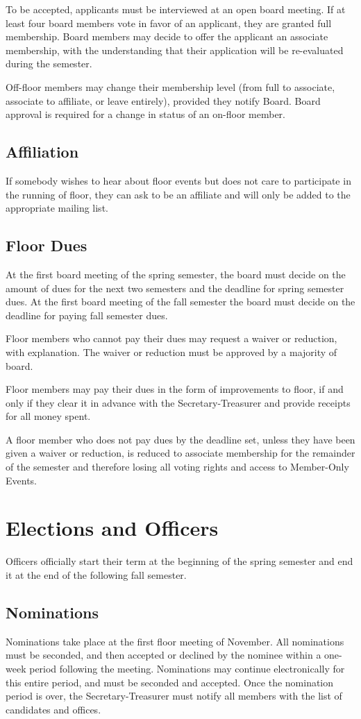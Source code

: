 \documentclass[12pt]{amsart}
\begin{document}
	To be accepted, applicants must be interviewed at an open board meeting. If at least four board members vote in favor of an applicant, they are granted full membership. Board members may decide to offer the applicant an associate membership, with the understanding that their application will be re-evaluated during the semester.

Off-floor members may change their membership level (from full to associate, associate to affiliate, or leave entirely), provided they notify Board. Board approval is required for a change in status of an on-floor member.
	\subsection{Affiliation}
	If somebody wishes to hear about floor events but does not care to participate in the running of floor, they can ask to be an affiliate and will only be added to the appropriate mailing list.
	\subsection {Floor Dues}
	At the first board meeting of the spring semester, the board must decide on the amount of dues for the next two semesters and the deadline for spring semester dues. At the first board meeting of the fall semester the board must decide on the deadline for paying fall semester dues.

	Floor members who cannot pay their dues may request a waiver or reduction, with explanation. The waiver or reduction must be approved by a majority of board. 
	
	Floor members may pay their dues in the form of improvements to floor, if and only if they clear it in advance with the Secretary-Treasurer and provide receipts for all money spent.

	A floor member who does not pay dues by the deadline set, unless they have been given a waiver or reduction, is reduced to associate membership for the remainder of the semester and therefore losing all voting rights and access to Member-Only Events.
\section {Elections and Officers}
Officers officially start their term at the beginning of the spring semester and end it at the end of the following fall semester.
	\subsection {Nominations}
	Nominations take place at the first floor meeting of November. All nominations must be seconded, and then accepted or declined by the nominee within a one-week period following the meeting. Nominations may continue electronically for this entire period, and must be seconded and accepted. Once the nomination period is over, the Secretary-Treasurer must notify all members with the list of candidates and offices.
\end{document}
